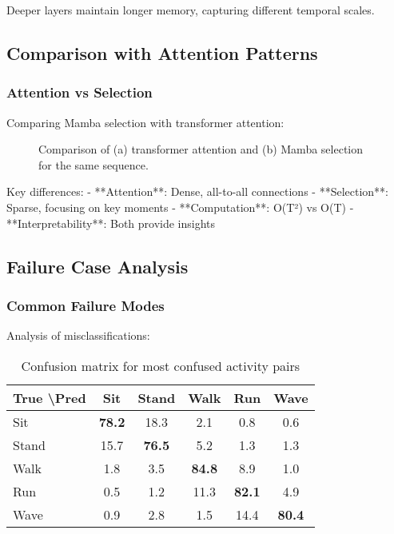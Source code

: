 \documentclass[10pt,journal,compsoc]{IEEEtran}
\begin{document}
Deeper layers maintain longer memory, capturing different temporal scales.

\subsection{Comparison with Attention Patterns}

\subsubsection{Attention vs Selection}

Comparing Mamba selection with transformer attention:

\begin{figure}[h]
\centering
\framebox[0.45\textwidth]{\rule{0pt}{3cm}}
\caption{Comparison of (a) transformer attention and (b) Mamba selection for the same sequence.}
\label{fig:attention_comparison}
\end{figure}

Key differences:
- **Attention**: Dense, all-to-all connections
- **Selection**: Sparse, focusing on key moments
- **Computation**: O(T²) vs O(T)
- **Interpretability**: Both provide insights

\subsection{Failure Case Analysis}

\subsubsection{Common Failure Modes}

Analysis of misclassifications:

\begin{table}[h]
\centering
\caption{Confusion matrix for most confused activity pairs}
\label{tab:confusion}
\begin{tabular}{lccccc}
\toprule
True \textbackslash Pred & Sit & Stand & Walk & Run & Wave \\
\midrule
Sit & \textbf{78.2} & 18.3 & 2.1 & 0.8 & 0.6 \\
Stand & 15.7 & \textbf{76.5} & 5.2 & 1.3 & 1.3 \\
Walk & 1.8 & 3.5 & \textbf{84.8} & 8.9 & 1.0 \\
Run & 0.5 & 1.2 & 11.3 & \textbf{82.1} & 4.9 \\
Wave & 0.9 & 2.8 & 1.5 & 14.4 & \textbf{80.4} \\
\bottomrule
\end{tabular}
\end{table}
\end{document}
